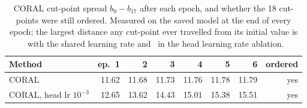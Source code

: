 \begin{table}[H]
\centering
\footnotesize
\caption{CORAL cut-point spread $b_0-b_{17}$ after each epoch, and whether the 18 cut-points were still ordered. Measured on the saved model at the end of every epoch; the largest distance any cut-point ever travelled from its initial value is \cutMoveFineCoral\ with the shared learning rate and \cutMoveCoralHeadlr\ in the head learning rate ablation.}
\label{tab:res-cutpoints}
\begin{tabular}{lrrrrrrr}
\toprule
\textbf{Method} & \textbf{ep.\ 1} & \textbf{2} & \textbf{3} & \textbf{4} & \textbf{5} & \textbf{6} & \textbf{ordered} \\
\midrule
CORAL & 11.62 & 11.68 & 11.73 & 11.76 & 11.78 & 11.79 & yes \\
CORAL, head lr $10^{-3}$ & 12.65 & 13.62 & 14.43 & 15.01 & 15.38 & 15.51 & yes \\
\bottomrule
\end{tabular}
\end{table}
